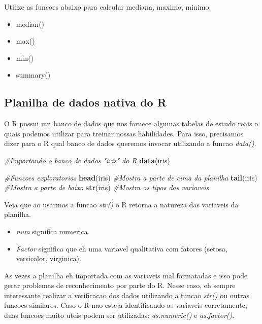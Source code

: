 \documentclass[
]{book}
\newenvironment{Shaded}{\begin{snugshade}}{\end{snugshade}}
\newcommand{\CommentTok}[1]{\textcolor[rgb]{0.56,0.35,0.01}{\textit{#1}}}
\newcommand{\FunctionTok}[1]{\textcolor[rgb]{0.13,0.29,0.53}{\textbf{#1}}}
\newcommand{\NormalTok}[1]{#1}
\providecommand{\tightlist}{%
  \setlength{\itemsep}{0pt}\setlength{\parskip}{0pt}}
\begin{document}
Utilize as funcoes abaixo para calcular mediana, maximo, minimo:

\begin{itemize}
\tightlist
\item
  median()
\item
  max()
\item
  min()
\item
  summary()
\end{itemize}

\hypertarget{planilha-de-dados-nativa-do-r}{%
\subsection{Planilha de dados nativa do R}\label{planilha-de-dados-nativa-do-r}}

O R possui um banco de dados que nos fornece algumas tabelas de estudo reais o quais podemos utilizar para treinar nossas habilidades. Para isso, precisamos dizer para o R qual banco de dados queremos invocar utilizando a funcao \emph{data()}.

\begin{Shaded}
\begin{Highlighting}[]
\CommentTok{\#Importando o banco de dados "iris" do R}
\FunctionTok{data}\NormalTok{(iris)}

\CommentTok{\#Funcoes exploratorias}
\FunctionTok{head}\NormalTok{(iris) }\CommentTok{\#Mostra a parte de cima da planilha }
\FunctionTok{tail}\NormalTok{(iris) }\CommentTok{\#Mostra a parte de baixo}
\FunctionTok{str}\NormalTok{(iris)  }\CommentTok{\#Mostra os tipos das variaveis}
\end{Highlighting}
\end{Shaded}

Veja que ao usarmos a funcao \emph{str()} o R retorna a natureza das variaveis da planilha.

\begin{itemize}
\tightlist
\item
  \emph{num} significa numerica.
\item
  \emph{Factor} significa que eh uma variavel qualitativa com fatores (setosa, versicolor, virginica).
\end{itemize}

As vezes a planilha eh importada com as variaveis mal formatadas e isso pode gerar problemas de reconhecimento por parte do R. Nesse caso, eh sempre interessante realizar a verificacao dos dados utilizando a funcao \emph{str()} ou outras funcoes similares. Caso o R nao esteja identificando as variaveis corretamente, duas funcoes muito uteis podem ser utilizadas: \emph{as.numeric()} e \emph{as.factor()}.
\end{document}
